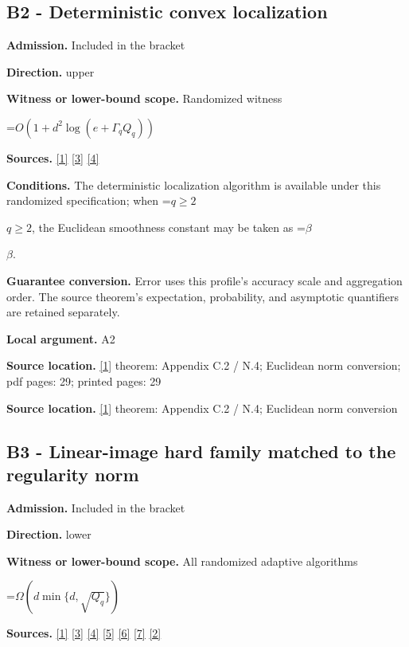 \documentclass[10pt,a4paper]{article}
\newcommand{\AtlasMath}[1]{\par\begingroup\centering\setbox0=\hbox{$\displaystyle #1$}\ifdim\wd0>1.4\linewidth\typeout{ATLAS WIDE FORMULA: \the\wd0}\fi\ifdim\wd0>\linewidth\resizebox{\linewidth}{!}{\box0}\else\box0\fi\par\endgroup}
\newcommand{\AtlasInlineMath}[1]{\begingroup\setbox0=\hbox{$#1$}\ifdim\wd0>.4\linewidth\endgroup\AtlasMath{#1}\else\endgroup$#1$\fi}
\begin{document}
\subsection{B2 - Deterministic convex localization}
\textbf{Admission.} Included in the bracket

\textbf{Direction.} upper

\textbf{Witness or lower-bound scope.} Randomized witness

\AtlasMath{O(1+d^2\log(e+\Gamma_qQ_q))}
\textbf{Sources.} \href{https://arxiv.org/html/2610.00345v1}{[1]} \href{https://arxiv.org/html/2607.16558v2}{[3]} \href{https://www.mathnet.ru/php/archive.phtml?jrnid=mzm&option_lang=eng&paperid=1697&wshow=paper}{[4]}

\textbf{Conditions.} The deterministic localization algorithm is available under this randomized specification; when \AtlasInlineMath{q\ge2}, the Euclidean smoothness constant may be taken as \AtlasInlineMath{\beta}.

\textbf{Guarantee conversion.} Error uses this profile's accuracy scale and aggregation order. The source theorem's expectation, probability, and asymptotic quantifiers are retained separately.

\textbf{Local argument.} A2

\textbf{Source location.} \href{https://arxiv.org/html/2610.00345v1}{[1]} theorem: Appendix C.2 / N.4; Euclidean norm conversion; pdf pages: 29; printed pages: 29

\textbf{Source location.} \href{https://arxiv.org/html/2610.00345v1}{[1]} theorem: Appendix C.2 / N.4; Euclidean norm conversion

\subsection{B3 - Linear-image hard family matched to the regularity norm}
\textbf{Admission.} Included in the bracket

\textbf{Direction.} lower

\textbf{Witness or lower-bound scope.} All randomized adaptive algorithms

\AtlasMath{\Omega(d\min\{d,\sqrt{Q_q}\})}
\textbf{Sources.} \href{https://arxiv.org/html/2610.00345v1}{[1]} \href{https://arxiv.org/html/2607.16558v2}{[3]} \href{https://www.mathnet.ru/php/archive.phtml?jrnid=mzm&option_lang=eng&paperid=1697&wshow=paper}{[4]} \href{https://arxiv.org/abs/1802.09022}{[5]} \href{https://proceedings.neurips.cc/paper_files/paper/2022/file/329ef22fd8cb68223d5df09a037f7dd9-Paper-Conference.pdf}{[6]} \href{https://jmlr.org/papers/volume18/16-632/16-632.pdf}{[7]} \href{https://arxiv.org/pdf/1707.08486v2}{[2]}
\end{document}
